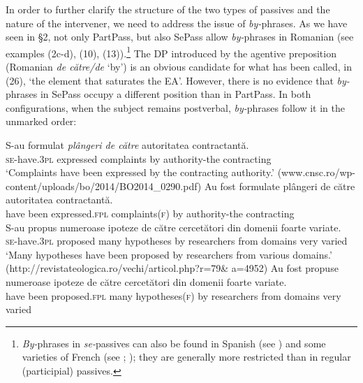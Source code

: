 \documentclass[output=paper]{langsci/langscibook}
\begin{document}
  In order to further clarify the structure of the two types of passives and the nature of the intervener, we need to address the issue of \textit{by-}phrases. As we have seen in §2, not only PartPass, but also SePass allow \textit{by-}phrases in Romanian (see examples (2c-d), (10), (13)).\footnote{\textit{By-}phrases in \textit{se-}passives can also be found in Spanish (see \citealt{MacDonald2016}) and some varieties of French (see \citealt{Authier1996}; \citealt{Zribi-Hertz2008}); they are generally more restricted than in regular (participial) passives.}  The DP introduced by the agentive preposition (Romanian \textit{de către/de} ‘by’) is an obvious candidate for what has been called, in (26), ‘the element that saturates the EA’. However, there is no evidence that \textit{by-}phrases in SePass occupy a different position than in PartPass. In both configurations, when the subject remains postverbal, \textit{by-}phrases follow it in the unmarked order: 

\ea%
    \label{ex:giurgea:29}
    \begin{xlista}[m'.]
    \ex
    \gll  S-au             {formulat} \emph{plângeri     de către}{ autoritatea     contractantă}{.}\\
          \textsc{se-}have.\textsc{3pl} expressed complaints by          authority-the contracting\\
    \glt  ‘Complaints have been expressed by the contracting authority.’ (www.cnsc.ro/wp-content/uploads/bo/2014/BO2014\_0290.pdf)
    \gll Au   fost  formulate        plângeri          de {către autoritatea}    contractantă.\\
         have been expressed.\textsc{fpl} complaints(\textsc{f)} by          authority-the contracting\\
    \ex
    \gll S-au           propus    numeroase ipoteze de către cercetători din domenii foarte variate.\\
         \textsc{se-}have.\textsc{3pl} proposed many        hypotheses by    researchers from domains very varied\\
    \glt ‘Many hypotheses have been proposed by researchers from various domains.’ (http://revistateologica.ro/vechi/articol.php?r=79\& a=4952)
    \gll Au  fost    propuse   numeroase ipoteze      de către cercetători din domenii foarte variate.\\
         have been proposed.\textsc{fpl} many hypotheses(\textsc{f)} by    researchers from domains very varied\\
    \end{xlista}
\z    
\end{document}
